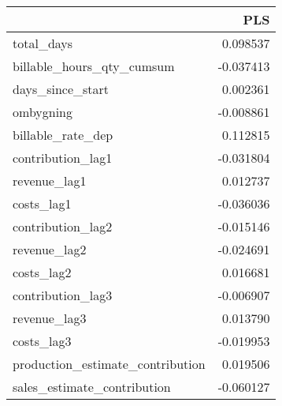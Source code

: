 \begin{tabular}{lr}
\toprule
{} &       PLS \\
\midrule
total\_days                       &  0.098537 \\
billable\_hours\_qty\_cumsum        & -0.037413 \\
days\_since\_start                 &  0.002361 \\
ombygning                        & -0.008861 \\
billable\_rate\_dep                &  0.112815 \\
contribution\_lag1                & -0.031804 \\
revenue\_lag1                     &  0.012737 \\
costs\_lag1                       & -0.036036 \\
contribution\_lag2                & -0.015146 \\
revenue\_lag2                     & -0.024691 \\
costs\_lag2                       &  0.016681 \\
contribution\_lag3                & -0.006907 \\
revenue\_lag3                     &  0.013790 \\
costs\_lag3                       & -0.019953 \\
production\_estimate\_contribution &  0.019506 \\
sales\_estimate\_contribution      & -0.060127 \\
\bottomrule
\end{tabular}
